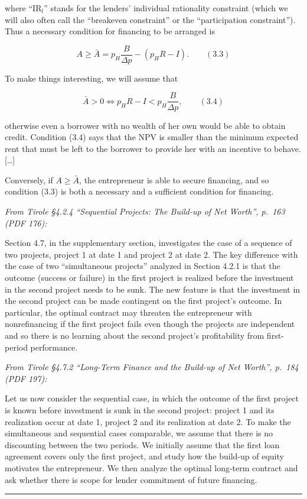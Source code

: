 \documentclass[11pt,a4paper]{article}
\newcommand{\stmtend}{\par\endgroup\nopagebreak\noindent\rule{\linewidth}{0.4pt}\par\medskip}
\begin{document}
where ``IR\(_l\)'' stands for the lenders' individual rationality constraint (which we will also
often call the ``breakeven constraint'' or the ``participation constraint''). Thus a necessary
condition for financing to be arranged is

\[A \geqslant \bar A = p_H\frac{B}{\Delta p} - (p_HR - I). \qquad (3.3)\]

To make things interesting, we will assume that

\[\bar A > 0 \iff p_HR - I < p_H\frac{B}{\Delta p}, \qquad (3.4)\]

otherwise even a borrower with no wealth of her own would be able to obtain credit. Condition (3.4)
says that the NPV is smaller than the minimum expected rent that must be left to the borrower to
provide her with an incentive to behave. {[}\ldots{]}

Conversely, if \(A \geqslant \bar A\), the entrepreneur is able to secure financing, and so
condition (3.3) is both a necessary and a sufficient condition for financing.

\emph{From Tirole §4.2.4 ``Sequential Projects: The Build-up of Net Worth'', p.~163 (PDF 176):}

Section 4.7, in the supplementary section, investigates the case of a sequence of two projects,
project 1 at date 1 and project 2 at date 2. The key difference with the case of two ``simultaneous
projects'' analyzed in Section 4.2.1 is that the outcome (success or failure) in the first project
is realized before the investment in the second project needs to be sunk. The new feature is that
the investment in the second project can be made contingent on the first project's outcome. In
particular, the optimal contract may threaten the entrepreneur with nonrefinancing if the first
project fails even though the projects are independent and so there is no learning about the second
project's profitability from first-period performance.

\emph{From Tirole §4.7.2 ``Long-Term Finance and the Build-up of Net Worth'', p.~184 (PDF 197):}

Let us now consider the sequential case, in which the outcome of the first project is known before
investment is sunk in the second project: project 1 and its realization occur at date 1, project 2
and its realization at date 2. To make the simultaneous and sequential cases comparable, we assume
that there is no discounting between the two periods. We initially assume that the first loan
agreement covers only the first project, and study how the build-up of equity motivates the
entrepreneur. We then analyze the optimal long-term contract and ask whether there is scope for
lender commitment of future financing.
\stmtend
\end{document}
